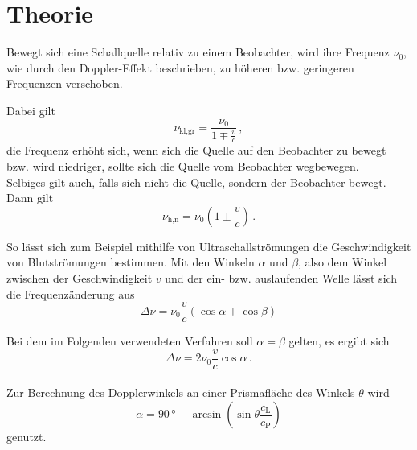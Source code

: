 \section{Theorie}
\label{sec:theorie}

Bewegt sich eine Schallquelle relativ zu einem
Beobachter, wird ihre Frequenz $\nu_0$, wie durch den
Doppler-Effekt beschrieben, zu höheren bzw.
geringeren Frequenzen verschoben.

Dabei gilt
\begin{equation}
    \nu_{\text{kl},\text{gr}} = \frac{\nu_0}
    {1 \mp \frac{v}{c}} \,,
    \label{eq:dopplerversch1}
\end{equation}
die Frequenz erhöht sich, wenn sich die 
Quelle auf den Beobachter zu bewegt bzw.
wird niedriger, sollte sich die Quelle vom
Beobachter wegbewegen. \\

Selbiges gilt auch, falls sich nicht die Quelle, 
sondern der Beobachter bewegt.
Dann gilt
\begin{equation}
    \nu_{\text{h},\text{n}} = \nu_0 \left(1 \pm \frac{v}{c} \right) \,.
    \label{eq:dopplerversch2}
\end{equation}

So lässt sich zum Beispiel mithilfe von Ultraschallströmungen
die Geschwindigkeit von Blutströmungen bestimmen.
Mit den Winkeln $\alpha$ und $\beta$, also dem Winkel zwischen der
Geschwindigkeit $v$ und der ein- bzw. auslaufenden Welle lässt sich
die Frequenzänderung aus
\begin{equation*}
    \Delta \nu = \nu_0 \frac{v}{c} (\cos \alpha + \cos \beta)
\end{equation*}

Bei dem im Folgenden verwendeten Verfahren soll 
$\alpha = \beta$ gelten, es ergibt sich
\begin{equation}
    \Delta \nu = 2 \nu_0 \frac{v}{c} \cos \alpha \,.
    \label{eq:dopplerversch}
\end{equation} \\

Zur Berechnung des Dopplerwinkels an einer Prismafläche 
des Winkels $\theta$ wird 
\begin{equation}
    \alpha = 90 \,° - \arcsin \left(\sin\theta \frac{c_\text{L}}{c_\text{P}} \right)
    \label{eq:dopplerwinkel}
\end{equation}
genutzt.